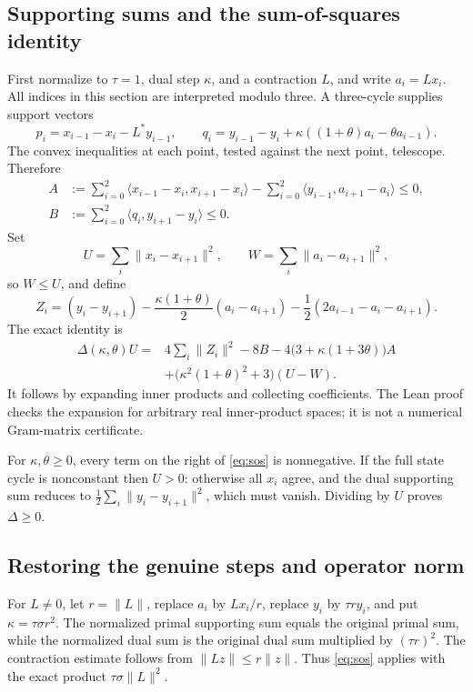 \documentclass[11pt]{article}
\theoremstyle{remark}\newtheorem{remark}[theorem]{Remark}
\newcommand{\ip}[2]{\langle #1,#2\rangle}
\newcommand{\norm}[1]{\lVert #1\rVert}
\begin{document}
\subsection{Supporting sums and the sum-of-squares identity}

First normalize to $\tau=1$, dual step $\kappa$, and a contraction $L$, and write $a_i=Lx_i$. All indices in this section are interpreted modulo three. A three-cycle supplies support vectors
\[
 p_i=x_{i-1}-x_i-L^*y_{i-1},\qquad
 q_i=y_{i-1}-y_i+\kappa((1+\theta)a_i-\theta a_{i-1}).
\]
The convex inequalities at each point, tested against the next point, telescope. Therefore
\begin{align*}
 A&:=\sum_{i=0}^2\ip{x_{i-1}-x_i}{x_{i+1}-x_i}
       -\sum_{i=0}^2\ip{y_{i-1}}{a_{i+1}-a_i}\le0,\\
 B&:=\sum_{i=0}^2\ip{q_i}{y_{i+1}-y_i}\le0.
\end{align*}
Set
\[
 U=\sum_i\norm{x_i-x_{i+1}}^2,\qquad
 W=\sum_i\norm{a_i-a_{i+1}}^2,
\]
so $W\le U$, and define
\[
 Z_i=(y_i-y_{i+1})-\frac{\kappa(1+\theta)}2(a_i-a_{i+1})
           -\frac12(2a_{i-1}-a_i-a_{i+1}).
\]
The exact identity is
\begin{equation}\label{eq:sos}
\begin{aligned}
 \Delta(\kappa,\theta)U
   ={}&4\sum_i\norm{Z_i}^2-8B
       -4\bigl(3+\kappa(1+3\theta)\bigr)A\\
      &+\bigl(\kappa^2(1+\theta)^2+3\bigr)(U-W).
\end{aligned}
\end{equation}
It follows by expanding inner products and collecting coefficients. The Lean proof checks the expansion for arbitrary real inner-product spaces; it is not a numerical Gram-matrix certificate.

For $\kappa,\theta\ge0$, every term on the right of \eqref{eq:sos} is nonnegative. If the full state cycle is nonconstant then $U>0$: otherwise all $x_i$ agree, and the dual supporting sum reduces to $\frac12\sum_i\norm{y_i-y_{i+1}}^2$, which must vanish. Dividing by $U$ proves $\Delta\ge0$.

\subsection{Restoring the genuine steps and operator norm}

For $L\ne0$, let $r=\norm{L}$, replace $a_i$ by $Lx_i/r$, replace $y_i$ by $\tau r y_i$, and put $\kappa=\tau\sigma r^2$. The normalized primal supporting sum equals the original primal sum, while the normalized dual sum is the original dual sum multiplied by $(\tau r)^2$. The contraction estimate follows from $\norm{Lz}\le r\norm z$. Thus \eqref{eq:sos} applies with the exact product $\tau\sigma\norm L^2$.
\end{document}
